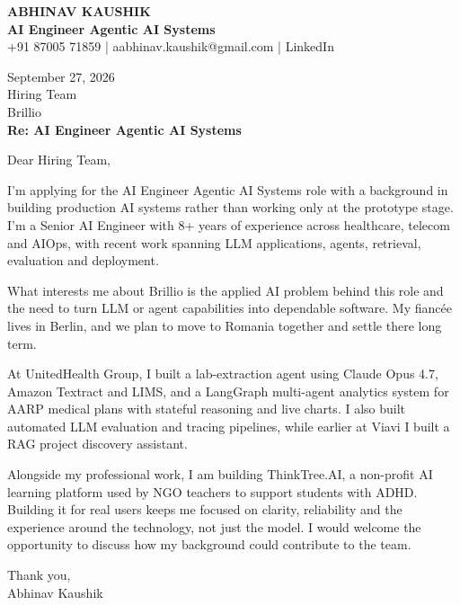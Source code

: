 \documentclass[10pt,a4paper]{article}
\begin{document}
\begin{center}
{\Large\bfseries ABHINAV KAUSHIK}\\[2pt]
{\bfseries AI Engineer Agentic AI Systems}\\[2pt]
+91 87005 71859 \quad | \quad aabhinav.kaushik@gmail.com \quad | \quad LinkedIn
\end{center}
\vspace{8pt}
September 27, 2026\\[6pt]
Hiring Team\\
Brillio\\[4pt]
\textbf{Re: AI Engineer Agentic AI Systems}

Dear Hiring Team,

I’m applying for the AI Engineer Agentic AI Systems role with a background in building production AI systems rather than working only at the prototype stage. I’m a Senior AI Engineer with 8+ years of experience across healthcare, telecom and AIOps, with recent work spanning LLM applications, agents, retrieval, evaluation and deployment.

What interests me about Brillio is the applied AI problem behind this role and the need to turn LLM or agent capabilities into dependable software. My fiancée lives in Berlin, and we plan to move to Romania together and settle there long term.

At UnitedHealth Group, I built a lab-extraction agent using Claude Opus 4.7, Amazon Textract and LIMS, and a LangGraph multi-agent analytics system for AARP medical plans with stateful reasoning and live charts. I also built automated LLM evaluation and tracing pipelines, while earlier at Viavi I built a RAG project discovery assistant.

Alongside my professional work, I am building ThinkTree.AI, a non-profit AI learning platform used by NGO teachers to support students with ADHD. Building it for real users keeps me focused on clarity, reliability and the experience around the technology, not just the model. I would welcome the opportunity to discuss how my background could contribute to the team.

Thank you,\\
Abhinav Kaushik
\end{document}
